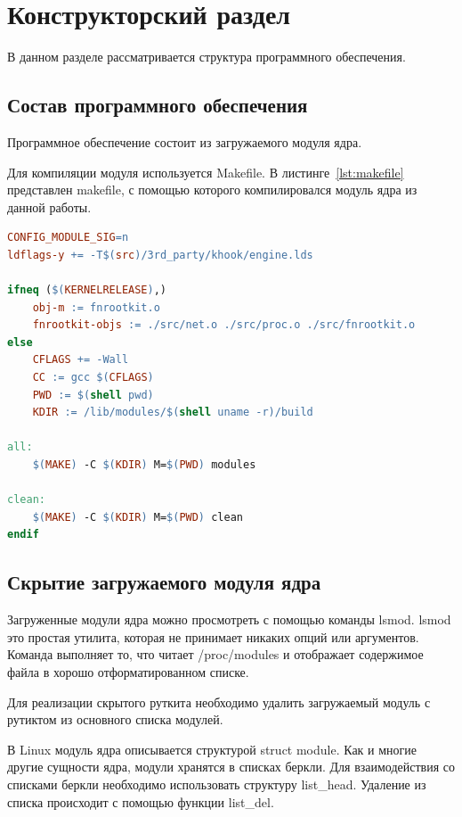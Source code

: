 \chapter{Конструкторский раздел}%
\label{cha:konstruktorskii_razdel}

В данном разделе рассматривается структура программного обеспечения.

\section{Состав программного обеспечения}%
\label{sec:sostav_programmnogo_obespecheniia}

Программное обеспечение состоит из загружаемого модуля ядра.

Для компиляции модуля используется Makefile. В листинге~\ref{lst:makefile} представлен makefile, с помощью которого компилировался модуль ядра из данной работы.
\begin{lstlisting}[language=make,caption={Makefile},label=lst:makefile]
CONFIG_MODULE_SIG=n
ldflags-y += -T$(src)/3rd_party/khook/engine.lds

ifneq ($(KERNELRELEASE),)
	obj-m := fnrootkit.o
	fnrootkit-objs := ./src/net.o ./src/proc.o ./src/fnrootkit.o
else
	CFLAGS += -Wall
	CC := gcc $(CFLAGS)
	PWD := $(shell pwd)
	KDIR := /lib/modules/$(shell uname -r)/build

all:
	$(MAKE) -C $(KDIR) M=$(PWD) modules

clean:
	$(MAKE) -C $(KDIR) M=$(PWD) clean
endif
\end{lstlisting}

\section{Скрытие загружаемого модуля ядра}%
\label{sec:skrytie_zagruzhaemogo_modulia_iadra}

Загруженные модули ядра можно просмотреть с помощью команды lsmod. lsmod это простая утилита, которая не принимает никаких опций или аргументов. Команда выполняет то, что читает /proc/modules и отображает содержимое файла в хорошо отформатированном списке.

Для реализации скрытого руткита необходимо удалить загружаемый модуль с рутиктом из основного списка модулей.

В Linux модуль ядра описывается структурой struct module. Как и многие другие сущности ядра, модули хранятся в списках беркли. Для взаимодействия со списками беркли необходимо использовать структуру list\_head. Удаление из списка происходит с помощью функции list\_del.


